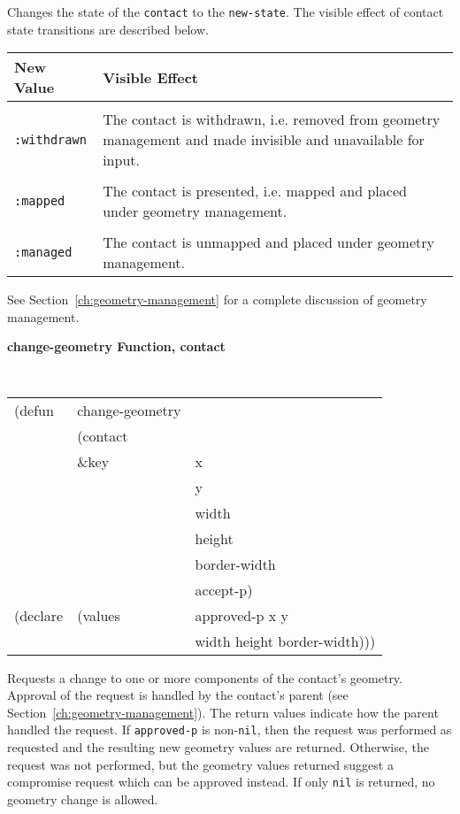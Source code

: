 \documentclass[twoside]{book}
\begin{document}
\begin{sloppy}
\begin{flushright}
\parbox[t]{6.125in}{
Changes the state of the {\tt contact} to the {\tt new-state}. The visible effect
of contact state transitions are described below.

\begin{center}
\begin{tabular}{lp{4.25in}}
New Value & Visible Effect \\ \hline \\
{\tt :withdrawn} & The contact is withdrawn, i.e. removed from geometry management and
made invisible and unavailable for input.\\ 
\\
{\tt :mapped} & The contact is presented, i.e. mapped and placed under geometry
management.\\ \\
{\tt :managed} &  The contact is unmapped and placed under geometry management. 
\end{tabular}
\end{center}

See Section~\ref{ch:geometry-management} for a complete discussion of 
geometry management.

}\end{flushright}


{\samepage
{\large {\bf change-geometry \hfill Function, contact}}
\begin{flushright}
\parbox[t]{6.125in}{
\tt
\begin{tabular}{lll}
\raggedright
(defun & change-geometry & \\
& (contact\\
& \&key & x  \\
& & y   \\
& & width \\
& & height   \\
& &border-width\\
& &accept-p) \\
(declare &(values &approved-p x y \\
&& width height border-width)))
\end{tabular}
\rm}
\end{flushright}
}

\begin{flushright}\parbox[t]{6.125in}{
Requests a change to one or more components of the contact's geometry.
Approval of the request is handled by the contact's parent (see
Section~\ref{ch:geometry-management}).
The return values indicate how the parent handled the 
request. If {\tt approved-p} is non-{\tt nil}, then the request was performed as
requested and
the resulting new geometry values are returned. Otherwise, the request was not
performed, but the geometry
values returned suggest a compromise request which can be approved instead.
If only {\tt nil} is returned, no geometry change is allowed.
}\end{flushright}


\end{sloppy}
\end{document}
